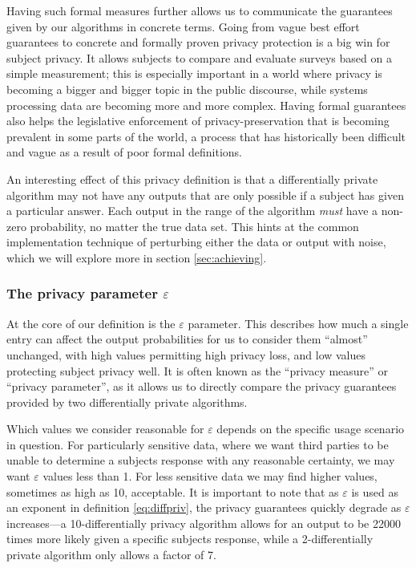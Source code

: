 \documentclass[12pt]{article}
\renewcommand{\epsilon}{\varepsilon}
\begin{document}
Having such formal measures further allows us to communicate the guarantees given by our algorithms in concrete terms. Going from vague best effort guarantees to concrete and formally proven privacy protection is a big win for subject privacy. It allows subjects to compare and evaluate surveys based on a simple measurement; this is especially important in a world where privacy is becoming a bigger and bigger topic in the public discourse, while systems processing data are becoming more and more complex. Having formal guarantees also helps the legislative enforcement of privacy-preservation that is becoming prevalent in some parts of the world, a process that has historically been difficult and vague as a result of poor formal definitions. \bigskip

An interesting effect of this privacy definition is that a differentially private algorithm may not have any outputs that are only possible if a subject has given a particular answer. Each output in the range of the algorithm \emph{must} have a non-zero probability, no matter the true data set. This hints at the common implementation technique of perturbing either the data or output with noise, which we will explore more in section \ref{sec:achieving}.

\subsubsection{The privacy parameter $\epsilon$ \label{sec:epsilon}}

At the core of our definition is the $\epsilon$ parameter. This describes how much a single entry can affect the output probabilities for us to consider them ``almost'' unchanged, with high values permitting high privacy loss, and low values protecting subject privacy well. It is often known as the ``privacy measure'' or ``privacy parameter'', as it allows us to directly compare the privacy guarantees provided by two differentially private algorithms.

Which values we consider reasonable for $\epsilon$ depends on the specific usage scenario in question. For particularly sensitive data, where we want third parties to be unable to determine a subjects response with any reasonable certainty, we may want $\epsilon$ values less than 1. For less sensitive data we may find higher values, sometimes as high as 10, acceptable. It is important to note that as $\epsilon$ is used as an exponent in definition \ref{eq:diffpriv}, the privacy guarantees quickly degrade as $\epsilon$ increases---a 10-differentially privacy algorithm allows for an output to be 22000 times more likely given a specific subjects response, while a 2-differentially private algorithm only allows a factor of 7.
\end{document}
